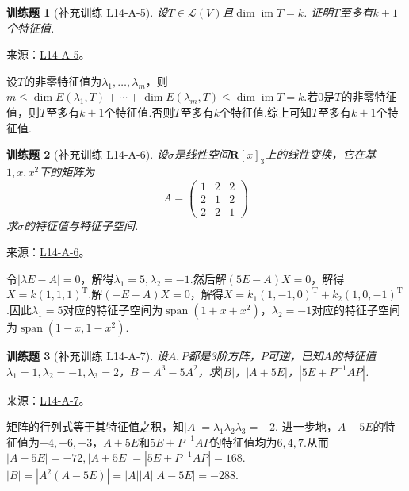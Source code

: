 \documentclass[UTF8,12pt,a4paper,fontset=fandol]{ctexart}
\newtheorem{exercise}{训练题}[section]
\begin{document}
\begin{exercise}[补充训练 L14-A-5]\label{prob:L14-A-5}
设$T\in \mathcal{L}(V)$且$\dim\operatorname{im} T=k$. 证明$T$至多有$k+1$个特征值.
\end{exercise}
\noindent 来源：\href{https://github.com/yhwu-is/Linear-Algebra-Left-Undone/blob/new/%E8%AE%B2%E4%B9%89/%E4%B8%93%E9%A2%98/14%20%E7%9B%B8%E4%BC%BC%E6%A0%87%E5%87%86%E5%BD%A2%EF%BC%9A%E5%8A%A8%E6%9C%BA%E4%B8%8E%E5%9F%BA%E7%A1%80.tex}{L14-A-5}。
\begin{solve}
设$T$的非零特征值为$\lambda_1,\ldots,\lambda_m$，则$m\leqslant \dim E(\lambda_1,T)+\cdots+\dim E(\lambda_m,T)\leqslant \dim\operatorname{im} T=k$.若$0$是$T$的非零特征值，则$T$至多有$k+1$个特征值.否则$T$至多有$k$个特征值.综上可知$T$至多有$k+1$个特征值.
\end{solve}

\begin{exercise}[补充训练 L14-A-6]\label{prob:L14-A-6}
设$\sigma$是线性空间$\mathbf{R}[x]_3$上的线性变换，它在基$1,x,x^2$下的矩阵为
        \[ A=\begin{pmatrix}
                1 & 2 & 2 \\ 2 & 1 & 2 \\ 2 & 2 & 1
            \end{pmatrix}\]
        求$\sigma$的特征值与特征子空间.
\end{exercise}
\noindent 来源：\href{https://github.com/yhwu-is/Linear-Algebra-Left-Undone/blob/new/%E8%AE%B2%E4%B9%89/%E4%B8%93%E9%A2%98/14%20%E7%9B%B8%E4%BC%BC%E6%A0%87%E5%87%86%E5%BD%A2%EF%BC%9A%E5%8A%A8%E6%9C%BA%E4%B8%8E%E5%9F%BA%E7%A1%80.tex}{L14-A-6}。
\begin{solve}
令$|\lambda E-A|=0$，解得$\lambda_1=5,\lambda_2=-1$.然后解$(5E-A)X=0$，解得$X=k(1,1,1)^\mathrm{T}$.解$(-E-A)X=0$，解得$X=k_1(1,-1,0)^\mathrm{T}+k_2(1,0,-1)^\mathrm{T}$.因此$\lambda_1=5$对应的特征子空间为$\operatorname{span}(1+x+x^2)$，$\lambda_2=-1$对应的特征子空间为$\operatorname{span}(1-x,1-x^2)$.
\end{solve}

\begin{exercise}[补充训练 L14-A-7]\label{prob:L14-A-7}
设$A,P$都是3阶方阵，$P$可逆，已知$A$的特征值$\lambda_1=1,\lambda_2=-1,\lambda_3=2$，$B=A^3-5A^2$，求$|B|$，$|A+5E|$，$|5E+P^{-1}AP|$.
\end{exercise}
\noindent 来源：\href{https://github.com/yhwu-is/Linear-Algebra-Left-Undone/blob/new/%E8%AE%B2%E4%B9%89/%E4%B8%93%E9%A2%98/14%20%E7%9B%B8%E4%BC%BC%E6%A0%87%E5%87%86%E5%BD%A2%EF%BC%9A%E5%8A%A8%E6%9C%BA%E4%B8%8E%E5%9F%BA%E7%A1%80.tex}{L14-A-7}。
\begin{solve}
矩阵的行列式等于其特征值之积，知$|A|=\lambda_1\lambda_2\lambda_3=-2$.
            进一步地，$A-5E$的特征值为$-4,-6,-3$，$A+5E$和$5E+P^{-1}AP$的特征值均为$6,4,7$.从而$|A-5E|=-72,|A+5E|=|5E+P^{-1}AP|=168$.
            $|B|=|A^2(A-5E)|=|A||A||A-5E|=-288$.
\end{solve}
\end{document}
